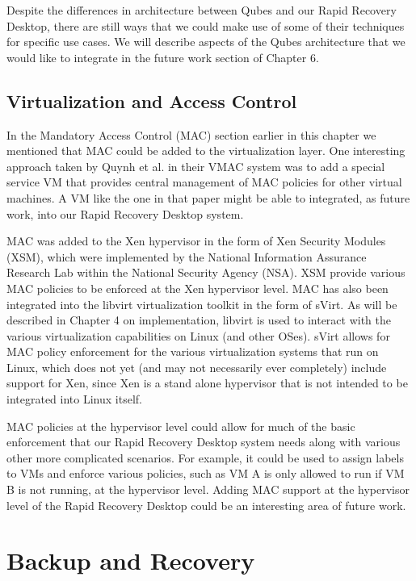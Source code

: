 Despite the differences in architecture between Qubes and our Rapid Recovery Desktop, there are still ways that we could make use of some of their techniques for specific use cases. We will describe aspects of the Qubes architecture that we would like to integrate in the future work section of Chapter 6.

\subsection{Virtualization and Access Control}

In the Mandatory Access Control (MAC) section earlier in this chapter we mentioned that MAC could be added to the virtualization layer. One interesting approach taken by Quynh et al.\cite{Quynh_2006} in their VMAC system was to add a special service VM that provides central management of MAC policies for other virtual machines. A VM like the one in that paper might be able to integrated, as future work, into our Rapid Recovery Desktop system.

MAC was added to the Xen hypervisor in the form of Xen Security Modules (XSM)\cite{xsm_xen_summit_3rd,xsm_xen_summit_4th}, which were implemented by the National Information Assurance Research Lab within the National Security Agency (NSA). XSM provide various MAC policies to be enforced at the Xen hypervisor level. MAC has also been integrated into the libvirt virtualization toolkit\cite{libvirt_website} in the form of sVirt\cite{sVirt_website}. As will be described in Chapter 4 on implementation, libvirt is used to interact with the various virtualization capabilities on Linux (and other OSes).  sVirt allows for MAC policy enforcement for the various virtualization systems that run on Linux, which does not yet (and may not necessarily ever completely) include support for Xen, since Xen is a stand alone hypervisor that is not intended to be integrated into Linux itself.

MAC policies at the hypervisor level could allow for much of the basic enforcement that our Rapid Recovery Desktop system needs along with various other more complicated scenarios. For example, it could be used to assign labels to VMs and enforce various policies, such as VM A is only allowed to run if VM B is not running, at the hypervisor level. Adding MAC support at the hypervisor level of the Rapid Recovery Desktop could be an interesting area of future work.

\section{Backup and Recovery}

